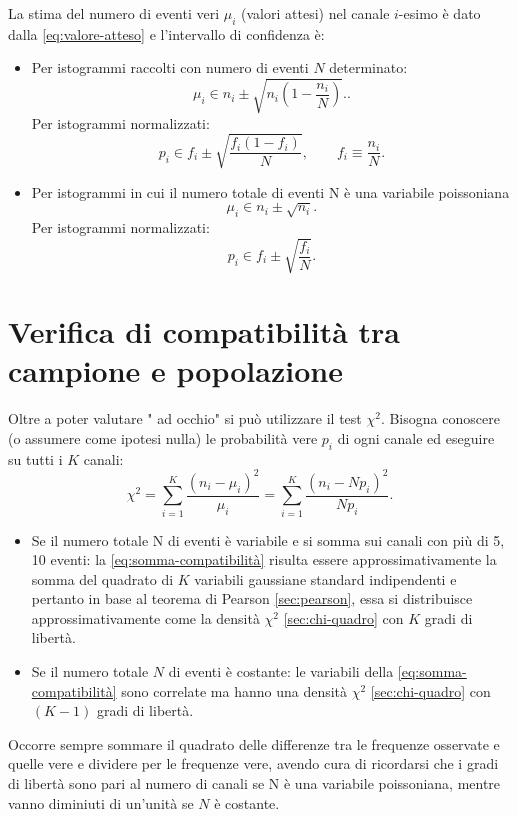 La stima del numero di eventi veri $\mu_i$ (valori attesi) nel canale $i$-esimo è dato dalla \ref{eq:valore-atteso} e l'intervallo di confidenza è:
\begin{itemize}
\item Per istogrammi raccolti con numero di eventi $N$ determinato:
\begin{equation}
{ \mu  }_{ i }\in { n }_{ i }\pm \sqrt { { n }_{ i }\left( 1-\frac { { n }_{ i } }{ N }  \right)  } ..
\end{equation}
Per istogrammi normalizzati:
\begin{equation}
p_i \in f_i \pm \sqrt { \frac { { f }_{ i }\left( 1-{ f }_{ i } \right)  }{ N }  }, \qquad f_i\equiv \frac{n_i}{N} .
\end{equation}
\item Per istogrammi in cui il numero totale di eventi N è una variabile poissoniana
\begin{equation}
{ \mu  }_{ i }\in { n }_{ i }\pm \sqrt { n_{ i } } .
\end{equation}
Per istogrammi normalizzati:
\begin{equation}
p_i \in f_i \pm\sqrt { \frac { { f }_{ i } }{ N }  } .
\end{equation}
\end{itemize}

\section{Verifica di compatibilità tra campione e popolazione} %
\label{sec:test-campione-popolazione}
Oltre a poter valutare " ad occhio" si può utilizzare il test $\chi^2$. Bisogna conoscere (o assumere come ipotesi nulla) le probabilità vere $p_i$ di ogni canale ed eseguire su tutti i $K$ canali:
\begin{equation}
\label{eq:somma-compatibilità}
{ \chi  }^{ 2 }=\sum _{ i=1 }^{ K }{ \frac { { \left( { n }_{ i }-{ \mu  }_{ i } \right)  }^{ 2 } }{ { \mu  }_{ i } }  } =\sum _{ i=1 }^{ K }{ \frac { { \left( { n }_{ i }-N{ p }_{ i } \right)  }^{ 2 } }{ N{ p }_{ i } }  } .
\end{equation}
\begin{itemize}
\item Se il numero totale N di eventi è variabile e si somma sui canali con più di 5, 10 eventi: la \ref{eq:somma-compatibilità} risulta essere approssimativamente la somma del quadrato di $K$ variabili gaussiane standard indipendenti e pertanto in base al teorema di Pearson \ref{sec:pearson}, essa si distribuisce approssimativamente come la densità $\chi^2$ \ref{sec:chi-quadro} con $K$ gradi di libertà.
\item Se il numero totale $N$ di eventi è costante: le variabili della \ref{eq:somma-compatibilità} sono correlate ma hanno una densità $\chi^2$ \ref{sec:chi-quadro} con $\left(K-1\right)$ gradi di libertà.
\end{itemize}
Occorre sempre sommare il quadrato delle differenze tra le frequenze osservate e quelle vere e dividere per le frequenze vere, avendo cura di ricordarsi che i gradi di libertà sono pari al numero di canali se N è una variabile poissoniana, mentre vanno diminiuti di un'unità se $N$ è costante.

